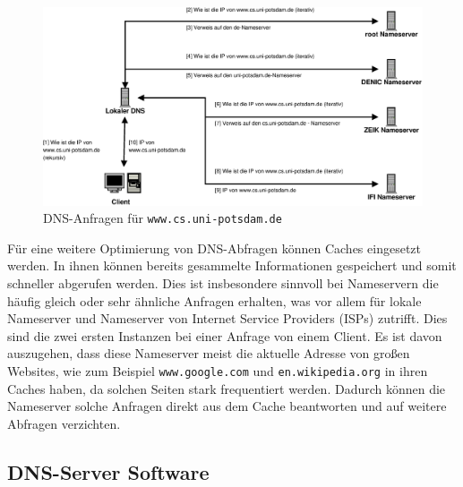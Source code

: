 \documentclass[a4paper, 12pt, BCOR10mm, DIV12, toc=bibliography, toc=listof, german]{scrbook}
\begin{document}
				\begin{figure}
					\centering
					\includegraphics[width=\textwidth]{images/request}
					\caption{DNS-Anfragen für \texttt{www.cs.uni-potsdam.de}} %
					\label{fig:bsp-request}
				\end{figure}

				Für eine weitere Optimierung von DNS-Abfragen können Caches eingesetzt werden. In ihnen
				können bereits gesammelte Informationen gespeichert und somit schneller abgerufen werden.
				Dies ist insbesondere sinnvoll bei Nameservern die häufig gleich oder sehr ähnliche Anfragen
				erhalten, was vor allem für lokale Nameserver und Nameserver von Internet Service Providers
				(ISPs) zutrifft. Dies sind die zwei ersten Instanzen bei einer Anfrage von einem Client. Es
				ist davon auszugehen, dass diese Nameserver meist die aktuelle Adresse von großen Websites,
				wie zum Beispiel \texttt{www.google.com} und \texttt{en.wikipedia.org} in ihren Caches
				haben, da solchen Seiten stark frequentiert werden. Dadurch können die Nameserver solche
				Anfragen direkt aus dem Cache beantworten und auf weitere Abfragen verzichten.

				
				

			\subsection{DNS-Server Software} %
			\label{sub:software}
			
\end{document}
